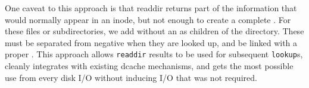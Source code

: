 
One caveat to this approach is that readdir returns part of the
information that would normally appear in an inode, but not enough to
create a complete \inode{}.
For these files or subdirectories, we add \dentries{} without an \inode{} as children of the directory.
These \dentries{} must be separated from negative \dentries{} when they are looked up, and be linked with a proper \inode{}.
This approach allows {\tt readdir} results to be used for subsequent {\tt lookup}s, cleanly
integrates with existing dcache mechanisms, and gets the most possible
use from every disk I/O without inducing I/O that was not required.



